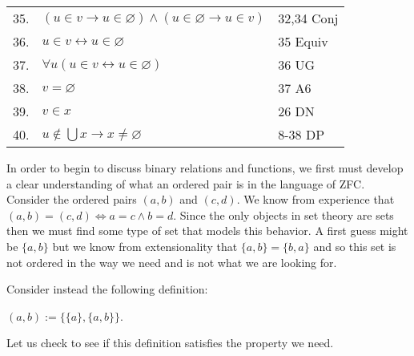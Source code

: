 \documentclass[12pt, a4paper]{article}
\begin{document}
\begin{table}[h!]
\begin{center}
\begin{tabular}{l l l}
      35.& \hspace{10mm}$(u\in v\rightarrow u\in\varnothing)\wedge(u\in\varnothing\rightarrow u\in v)$ & 32,34 Conj\\
      36.& \hspace{10mm}$u\in v\leftrightarrow u\in\varnothing$ & 35 Equiv\\
      37.& \hspace{10mm}$\forall u(u\in v\leftrightarrow u\in\varnothing)$ & 36 UG\\
      38.& \hspace{10mm}$v=\varnothing$ & 37 A6\\
      39.& \hspace{10mm}$v\in x$ & 26 DN\\
      40.& $u\notin\bigcup x\rightarrow x\neq\varnothing$ & 8-38 DP\\
     
      \hline
    \end{tabular}
  \end{center}
\end{table}

\newpage

\noindent In order to begin to discuss binary relations and functions, we first must develop a clear understanding of what an ordered pair is in the language of ZFC. Consider the ordered pairs $(a, b)$ and $(c, d)$. We know from experience that $(a,b)=(c,d)\Leftrightarrow a=c\wedge b=d$. Since the only objects in set theory are sets then we must find some type of set that models this behavior. A first guess might be $\{a,b\}$ but we know from extensionality that $\{a,b\}=\{b,a\}$ and so this set is not ordered in the way we need and is not what we are looking for.\par

\vspace{4mm}

\noindent Consider instead the following definition:\par

\vspace{4mm}

\centerline{$(a,b):=\{\{a\},\{a,b\}\}$.}

\vspace{4mm}

\noindent Let us check to see if this definition satisfies the property we need.
\end{document}
